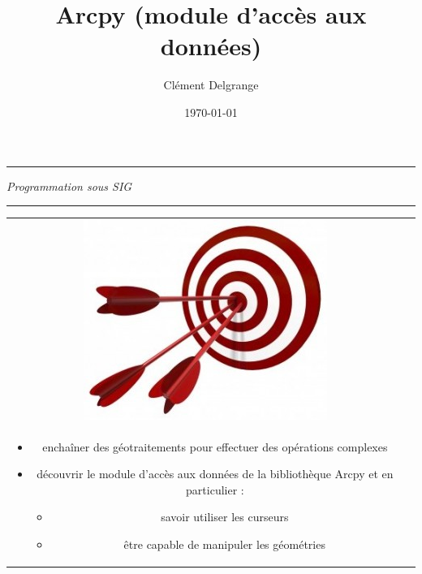 \documentclass[11pt]{article}
\title{Arcpy (module d'accès aux données)}
\author{Clément Delgrange}
\date{\today}
\newenvironment{objectifs}{
	\begin{lrbox}{\mybox}
		\begin{minipage}{0.9\textwidth}
			\vspace{1em}
			\begin{tabular}[t t]{c c}
				\includegraphics[width=0.1\linewidth]{img/goals.jpg} &
				\begin{minipage}[c]{0.8\linewidth}
					\hspace{2em}\textbf{\large{Objectifs :}} \\
}{
				\end{minipage}
			\end{tabular}
			\vspace{1em}
		\end{minipage}
	\end{lrbox}
	\fbox{\usebox{\mybox}}
}
\begin{document}
\parindent=0cm

\makeatletter
\begin{center}
	\hrule
	\vspace{1em}
	{\small \textit{Programmation sous SIG}}\\	
	\vspace{0.5em}
	{\Large \bfseries{\@title}}
	\vspace{1em}
	\hrule
\end{center}
\makeatother


\begin{objectifs}
\begin{itemize}
	\item enchaîner des géotraitements pour effectuer des opérations complexes
	\item découvrir le module d'accès aux données de la bibliothèque Arcpy et en particulier :
	\begin{itemize}
	\item savoir utiliser les curseurs
	\item être capable de manipuler les géométries
	\end{itemize}
\end{itemize}
\end{objectifs}




%
\end{document}
